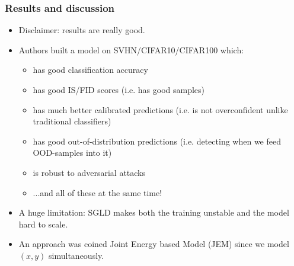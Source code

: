 \documentclass[10pt]{beamer}
\begin{document}
\begin{frame}
    \frametitle{Results and discussion}
    \begin{itemize}
        \item\pause Disclaimer: results are really good.
        \item\pause Authors built a model on SVHN/CIFAR10/CIFAR100 which:
        \begin{itemize}
            \item\pause has good classification accuracy
            \item\pause has good IS/FID scores (i.e. has good samples)
            \item\pause has much better calibrated predictions (i.e. is not overconfident unlike traditional classifiers)
            \item\pause has good out-of-distribution predictions (i.e. detecting when we feed OOD-samples into it)
            \item\pause is robust to adversarial attacks
            \item\pause ...and all of these at the same time!
        \end{itemize}
        \item\pause A huge limitation: SGLD makes both the training unstable and the model hard to scale.
        \item\pause An approach was coined Joint Energy based Model (JEM) since we model $(x,y)$ simultaneously.
    \end{itemize}
\end{frame}
\end{document}
